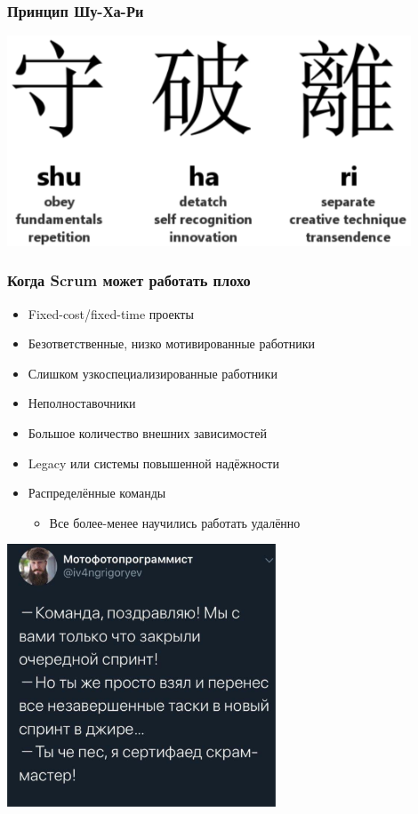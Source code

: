 \documentclass{../../slides-style}
\begin{document}
    \begin{frame}
        \frametitle{Принцип Шу-Ха-Ри}
        \begin{center}
            \includegraphics[width=0.9\textwidth]{shuHaRi.png}
        \end{center}
    \end{frame}

    \begin{frame}
        \frametitle{Когда Scrum может работать плохо}
        \begin{itemize}
            \item Fixed-cost/fixed-time проекты
            \item Безответственные, низко мотивированные работники
            \item Слишком узкоспециализированные работники
            \item Неполноставочники
            \item Большое количество внешних зависимостей
            \item Legacy или системы повышенной надёжности
            \item Распределённые команды
            \begin{itemize}
                \item Все более-менее научились работать удалённо
            \end{itemize}
        \end{itemize}
    \end{frame}

    \begin{frame}
        \begin{center}
            \includegraphics[width=0.6\textwidth]{nextSprint.png}
        \end{center}
    \end{frame}
\end{document}

